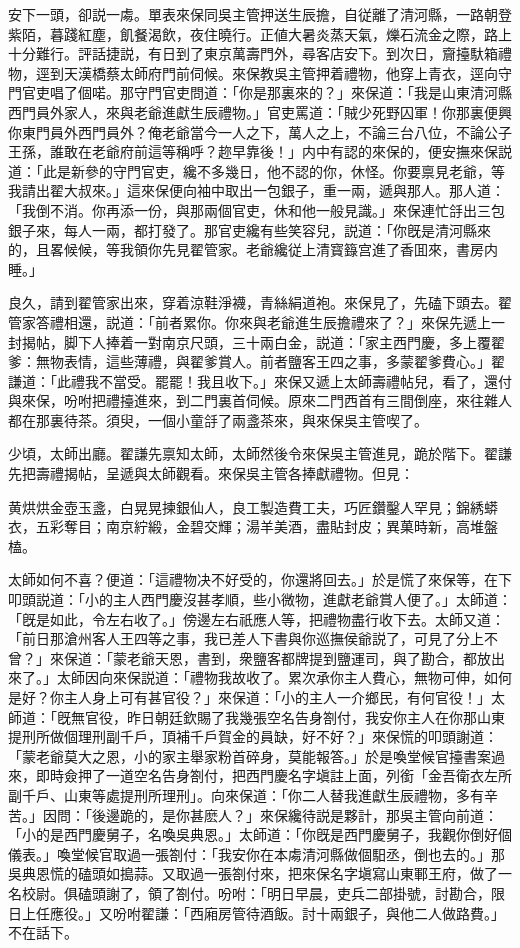 安下一頭，卻説一䖏。單表來保同吳主管押送生辰擔，自従離了清河縣，一路朝登紫陌，暮踐紅塵，飢餐渴飲，夜住曉行。正値大暑炎蒸天氣，爍石流金之際，路上十分難行。評話捷説，有日到了東京萬壽門外，尋客店安下。到次日，齎擡馱箱禮物，逕到天漢橋蔡太師府門前伺候。來保教吳主管押着禮物，他穿上青衣，逕向守門官吏唱了個喏。那守門官吏問道：「你是那裏來的？」來保道：「我是山東清河縣西門員外家人，來與老爺進獻生辰禮物。」官吏罵道：「賊少死野囚軍！你那裏便興你東門員外西門員外？俺老爺當今一人之下，萬人之上，不論三台八位，不論公子王孫，誰敢在老爺府前這等稱呼？趂早靠後！」内中有認的來保的，便安撫來保説道：「此是新參的守門官吏，纔不多幾日，他不認的你，休怪。你要禀見老爺，等我請出翟大叔來。」這來保便向袖中取出一包銀子，重一兩，遞與那人。那人道：「我倒不消。你再添一份，與那兩個官吏，休和他一般見識。」來保連忙㧱出三包銀子來，每人一兩，都打發了。那官吏纔有些笑容兒，説道：「你旣是清河縣來的，且畧候候，等我領你先見翟管家。老爺纔従上清寳籙宫進了香囬來，書房内睡。」

良久，請到翟管家出來，穿着涼鞋淨襪，青絲絹道袍。來保見了，先磕下頭去。翟管家答禮相還，説道：「前者累你。你來與老爺進生辰擔禮來了？」來保先遞上一封揭帖，脚下人捧着一對南京尺頭，三十兩白金，説道：「家主西門慶，多上覆翟爹：無物表情，這些薄禮，與翟爹賞人。前者鹽客王四之事，多蒙翟爹費心。」翟謙道：「此禮我不當受。罷罷！我且收下。」來保又遞上太師壽禮帖兒，看了，還付與來保，吩咐把禮擡進來，到二門裏首伺候。原來二門西首有三間倒座，來往雜人都在那裏待茶。須臾，一個小童㧱了兩盞茶來，與來保吳主管喫了。

少頃，太師出廳。翟謙先禀知太師，太師然後令來保吳主管進見，跪於階下。翟謙先把壽禮揭帖，呈遞與太師觀看。來保吳主管各捧獻禮物。但見：

\begin{myquote}
黄烘烘金壺玉盞，白晃晃揀銀仙人，良工製造費工夫，巧匠鑽鑿人罕見；錦綉蟒衣，五彩奪目；南京紵緞，金碧交輝；湯羊美酒，盡貼封皮；異菓時新，高堆盤榼。
\end{myquote}

太師如何不喜？便道：「這禮物决不好受的，你還將回去。」於是慌了來保等，在下叩頭説道：「小的主人西門慶沒甚孝順，些小微物，進獻老爺賞人便了。」太師道：「旣是如此，令左右收了。」傍邊左右祇應人等，把禮物盡行收下去。太師又道：「前日那滄州客人王四等之事，我已差人下書與你巡撫侯爺説了，可見了分上不曾？」來保道：「蒙老爺天恩，書到，衆鹽客都牌提到鹽運司，與了勘合，都放出來了。」太師因向來保説道：「禮物我故收了。累次承你主人費心，無物可伸，如何是好？你主人身上可有甚官役？」來保道：「小的主人一介鄉民，有何官役！」太師道：「旣無官役，昨日朝廷欽賜了我幾張空名告身劄付，我安你主人在你那山東提刑所做個理刑副千戶，頂補千戶賀金的員缺，好不好？」來保慌的叩頭謝道：「蒙老爺莫大之恩，小的家主舉家粉首碎身，莫能報答。」於是喚堂候官擡書案過來，即時僉押了一道空名告身劄付，把西門慶名字塡註上面，列銜「金吾衛衣左所副千戶、山東等處提刑所理刑」。向來保道：「你二人替我進獻生辰禮物，多有辛苦。」因問：「後邊跪的，是你甚麽人？」來保纔待説是夥計，那吳主管向前道：「小的是西門慶舅子，名喚吳典恩。」太師道：「你旣是西門慶舅子，我觀你倒好個儀表。」喚堂候官取過一張劄付：「我安你在本䖏清河縣做個馹丞，倒也去的。」那吳典恩慌的磕頭如搗蒜。又取過一張劄付來，把來保名字塡寫山東鄆王府，做了一名校尉。俱磕頭謝了，領了劄付。吩咐：「明日早晨，吏兵二部掛號，討勘合，限日上任應役。」又吩咐翟謙：「西廂房管待酒飯。討十兩銀子，與他二人做路費。」不在話下。

